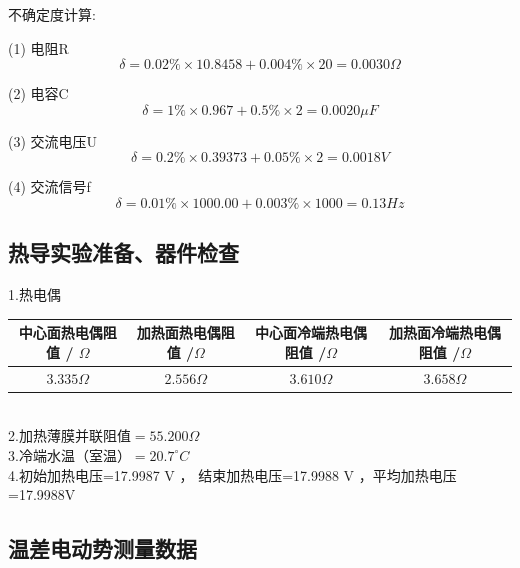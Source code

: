 \documentclass[UTF8]{ctexart}
\begin{document}
\noindent 不确定度计算:

(1) 电阻R
$$
\delta =0.02 \% \times 10.8458+0.004 \% \times 20=0.0030 \Omega
$$

(2) 电容C
$$
\delta  =1 \% \times 0.967+0.5 \% \times 2=0.0020 \mu F
$$

(3) 交流电压U
$$
\delta =0.2 \% \times 0.39373+0.05 \% \times 2=0.0018 V
$$

(4) 交流信号f
$$
\delta =0.01 \% \times 1000.00+0.003 \% \times 1000 =0.13 Hz
$$




\subsection{热导实验准备、器件检查}

\noindent 1.热电偶\\

\begin{tabular}{|c|c|c|c|}
\hline 中心面热电偶阻值  / $\Omega$  & 加热面热电偶阻值  /$ \Omega $ & 中心面冷端热电偶阻值  /$ \Omega $ & 加热面冷端热电偶阻值  /$ \Omega $ \\
\hline $ 3.335 \Omega$  &  $2.556\Omega$  &  $3.610 \Omega $ &  $3.658 \Omega$  \\
\hline
\end{tabular}\\

\noindent 2.加热薄膜并联阻值$= 55.200\Omega $\\

\noindent 3.冷端水温（室温）$= 20.7^\circ C $\\

\noindent 4.初始加热电压=17.9987 V ，  结束加热电压=17.9988 V ，平均加热电压=17.9988V   


\subsection{温差电动势测量数据}
\end{document}
